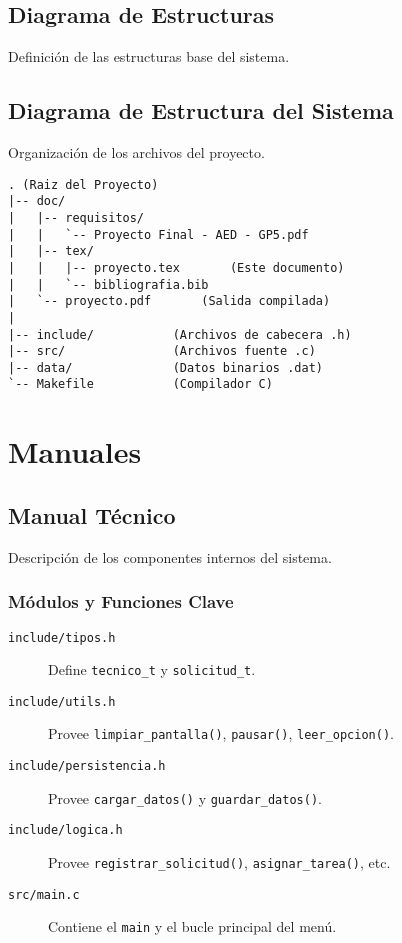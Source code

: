 \documentclass[12pt, letterpaper]{article}
\begin{document}
\subsection{Diagrama de Estructuras}
Definición de las estructuras base del sistema.


\subsection{Diagrama de Estructura del Sistema}
Organización de los archivos del proyecto.
\begin{verbatim}
. (Raiz del Proyecto)
|-- doc/
|   |-- requisitos/
|   |   `-- Proyecto Final - AED - GP5.pdf
|   |-- tex/
|   |   |-- proyecto.tex       (Este documento)
|   |   `-- bibliografia.bib
|   `-- proyecto.pdf       (Salida compilada)
|
|-- include/           (Archivos de cabecera .h)
|-- src/               (Archivos fuente .c)
|-- data/              (Datos binarios .dat)
`-- Makefile           (Compilador C)
\end{verbatim}


\newpage
\section{Manuales}

\subsection{Manual Técnico}
Descripción de los componentes internos del sistema.

\subsubsection{Módulos y Funciones Clave}
\begin{description}
    \item[\texttt{include/tipos.h}] Define \texttt{tecnico\_t} y \texttt{solicitud\_t}.
    \item[\texttt{include/utils.h}] Provee \texttt{limpiar\_pantalla()}, \texttt{pausar()}, \texttt{leer\_opcion()}.
    \item[\texttt{include/persistencia.h}] Provee \texttt{cargar\_datos()} y \texttt{guardar\_datos()}.
    \item[\texttt{include/logica.h}] Provee \texttt{registrar\_solicitud()}, \texttt{asignar\_tarea()}, etc.
    \item[\texttt{src/main.c}] Contiene el \texttt{main} y el bucle principal del menú.
\end{description}
\end{document}

